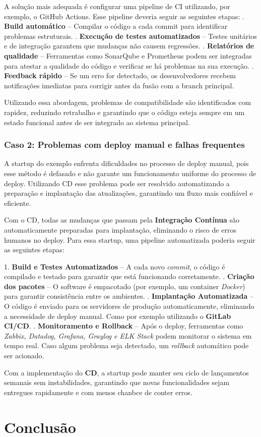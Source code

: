 \documentclass[a4paper,12pt]{article}
\begin{document}
A solução mais adequada é configurar uma pipeline de CI utilizando, por exemplo, o GitHub Actions. Esse pipeline deveria seguir as seguintes etapas:  . \textbf{Build automático} – Compilar o código a cada commit para identificar problemas estruturais.  . \textbf{Execução de testes automatizados} – Testes unitários e de integração garantem que mudanças não causem regressões.  . \textbf{Relatórios de qualidade} – Ferramentas como SonarQube e Prometheus podem ser integradas para atestar a qualidade do código e verificar se há problemas na sua execução.  . \textbf{Feedback rápido} – Se um erro for detectado, os desenvolvedores recebem notificações imediatas para corrigir antes da fusão com a branch principal.  \newline

Utilizando essa abordagem, problemas de compatibilidade são identificados com rapidez, reduzindo retrabalho e garantindo que o código esteja sempre em um estado funcional antes de ser integrado ao sistema principal.  

\subsubsection*{Caso 2: Problemas com deploy manual e falhas frequentes}  
A startup do exemplo enfrenta dificuldades no processo de deploy manual, pois esse método é defasado e não garante um funcionamento uniforme do processo de deploy. Utilizando CD esse problema pode ser resolvido automatizando a preparação e implantação das atualizações, garantindo um fluxo mais confiável e eficiente.  

Com o CD, todas as mudanças que passam pela \textbf{Integração Contínua} são automaticamente preparadas para implantação, eliminando o risco de erros humanos no deploy. Para essa startup, uma pipeline automatizada poderia seguir as seguintes etapas:  

1. \textbf{Build e Testes Automatizados} – A cada novo \textit{commit}, o código é compilado e testado para garantir que está funcionando corretamente.   . \textbf{Criação dos pacotes} – O software é empacotado (por exemplo, um container \textit{Docker}) para garantir consistência entre os ambientes.   . \textbf{Implantação Automatizada} – O código é enviado para os servidores de produção automaticamente, eliminando a necessidade de deploy manual. Como por exemplo utilizando o \textbf{GitLab CI/CD}.   . \textbf{Monitoramento e Rollback} – Após o deploy, ferramentas como \textit{Zabbix, Datadog, Grafana, Graylog e ELK Stack} podem monitorar o sistema em tempo real. Caso algum problema seja detectado, um \textit{rollback} automático pode ser acionado.   \newline

Com a implementação do \textbf{CD}, a startup pode manter seu ciclo de lançamentos semanais sem instabilidades, garantindo que novas funcionalidades sejam entregues rapidamente e com menos chanbce de conter erros.  


\newpage{}

\section*{Conclusão}
\lipsum[4] 
\end{document}
